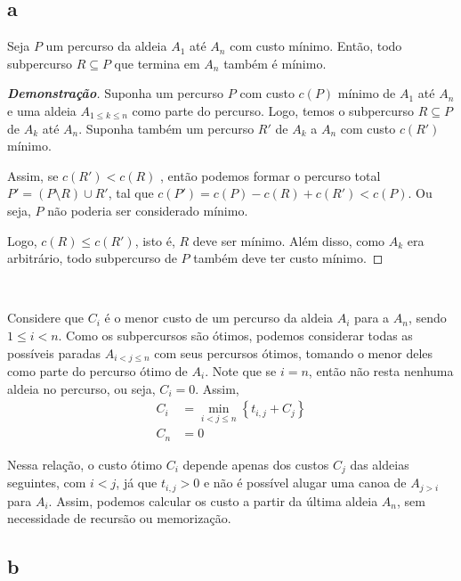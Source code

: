 \subsection{a} \label{sec:2:a}

\begin{theorem}
    Seja $P$ um percurso da aldeia $A_1$ até $A_n$ com custo mínimo. Então, todo subpercurso $R \subseteq P$ que termina em $A_n$ também é mínimo.
\end{theorem}

\begin{proof}[\textbf{Demonstração}]
    Suponha um percurso $P$ com custo $c(P)$ mínimo de $A_1$ até $A_n$ e uma aldeia $A_{1 \leq k \leq n}$ como parte do percurso. Logo, temos o subpercurso $R \subseteq P$ de $A_k$ até $A_n$. Suponha também um percurso $R'$ de $A_k$ a $A_n$ com custo $c\left(R'\right)$ mínimo.

    Assim, se $c\left(R'\right) < c(R)$ , então podemos formar o percurso total $P' = (P \setminus R) \cup R'$, tal que $c\left(P'\right) = c(P) - c(R) + c\left(R'\right) < c(P)$. Ou seja, $P$ não poderia ser considerado mínimo.

    Logo, $c(R) \leq c\left(R'\right)$, isto é, $R$ deve ser mínimo. Além disso, como $A_k$ era arbitrário, todo subpercurso de $P$ também deve ter custo mínimo.
\end{proof}

~

Considere que $C_i$ é o menor custo de um percurso da aldeia $A_i$ para a $A_n$, sendo $1 \leq i < n$. Como os subpercursos são ótimos, podemos considerar todas as possíveis paradas $A_{i < j \leq n}$ com seus percursos ótimos, tomando o menor deles como parte do percurso ótimo de $A_i$. Note que se $i = n$, então não resta nenhuma aldeia no percurso, ou seja, $C_i = 0$. Assim,
\begin{align*}
    C_i &= \min_{i < j \leq n}\left\{t_{i, j} + C_j\right\} \\
    C_n &= 0
\end{align*}

Nessa relação, o custo ótimo $C_i$ depende apenas dos custos $C_j$ das aldeias seguintes, com $i < j$, já que $t_{i, j} > 0$ e não é possível alugar uma canoa de $A_{j > i}$ para $A_i$. Assim, podemos calcular os custo a partir da última aldeia $A_n$, sem necessidade de recursão ou memorização.

\itemdsep
\subsection{b}

